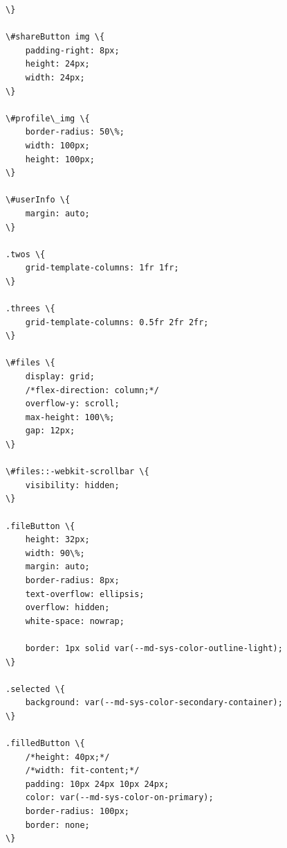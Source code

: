 \documentclass[14pt]{extarticle}
\begin{document}
\begin{Code}
\begin{Verbatim}
\}

\#shareButton img \{
    padding-right: 8px;
    height: 24px;
    width: 24px;
\}

\#profile\_img \{
    border-radius: 50\%;
    width: 100px;
    height: 100px;
\}

\#userInfo \{
    margin: auto;
\}

.twos \{
    grid-template-columns: 1fr 1fr;
\}

.threes \{
    grid-template-columns: 0.5fr 2fr 2fr;
\}

\#files \{
    display: grid;
    /*flex-direction: column;*/
    overflow-y: scroll;
    max-height: 100\%;
    gap: 12px;
\}

\#files::-webkit-scrollbar \{
    visibility: hidden;
\}

.fileButton \{
    height: 32px;
    width: 90\%;
    margin: auto;
    border-radius: 8px;
    text-overflow: ellipsis;
    overflow: hidden;
    white-space: nowrap;

    border: 1px solid var(--md-sys-color-outline-light);
\}

.selected \{
    background: var(--md-sys-color-secondary-container);
\}

.filledButton \{
    /*height: 40px;*/
    /*width: fit-content;*/
    padding: 10px 24px 10px 24px;
    color: var(--md-sys-color-on-primary);
    border-radius: 100px;
    border: none;
\}
\end{Verbatim}
\end{Code}
\end{document}
